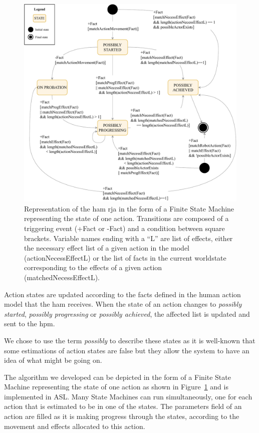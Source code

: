 \documentclass[a4paper,11pt,twoside]{StyleThese}
\begin{document}
\begin{figure}[!hbt]
	\includegraphics[width=\linewidth]{figures/chapter2/action_sm.pdf}
	\caption{Representation of the \acrfull{ham} \acrshort{rja} in the form of a Finite State Machine representing the state of one action. Transitions are composed of a triggering event (+Fact or -Fact) and a condition between square brackets. Variable names ending with a ``L'' are list of effects, either the necessary effect list of a given action in the model (actionNecessEffectL) or the list of facts in the current worldstate corresponding to the effects of a given action (matchedNecessEffectL).}
	\label{chap6:fig:action_monitoring}
\end{figure}

Action states are updated according to the facts defined in the human action model that the \acrshort{ham} receives. When the state of an action changes to \emph{possibly started}, \emph{possibly progressing} or \emph{possibly achieved}, the affected list is updated and sent to the \acrshort{hpm}. 

We chose to use the term \emph{possibly} to describe these states as it is well-known that some estimations of action states are false but they allow the system to have an idea of what might be going on.

The algorithm we developed can be depicted in the form of a Finite State Machine representing the state of one action as shown in Figure~\ref{chap6:fig:action_monitoring} and is implemented in ASL. Many State Machines can run simultaneously, one for each action that is estimated to be in one of the states. The parameters field of an action are filled as it is making progress through the states, according to the movement and effects allocated to this action.
\end{document}
